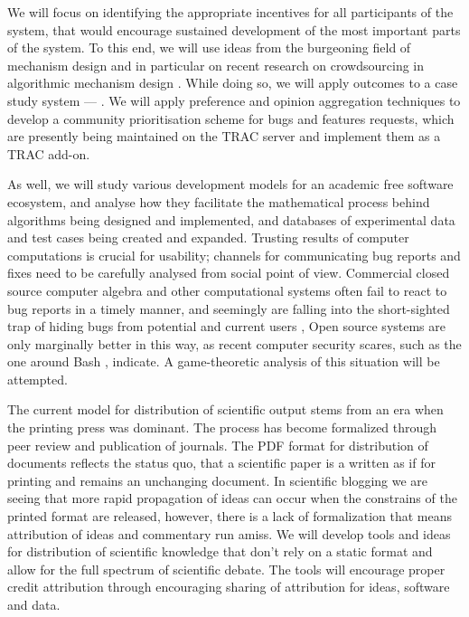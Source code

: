 \begin{workpackage}[id=social-aspects,wphases=1-48!.5,
  title=Social Aspects,
  lead=UO,
  UORM=1,USHRM=8, USORM=5]
\begin{wpdescription}
We will focus on identifying the appropriate incentives for all
participants of the system, that would encourage sustained development of the
most important parts of the system.  To this end, we will use ideas from the
burgeoning field of mechanism design \cite{AGTbook} and in
particular on recent research on crowdsourcing in algorithmic mechanism design
\cite{crowds}.  While doing so, we will apply outcomes to a case study
system --- \Sage.
We will apply preference and opinion aggregation techniques \cite{pref-aggr} to  develop
a community prioritisation scheme for \Sage bugs and features requests, which
are presently being maintained on the \Sage TRAC server \cite{trac-sagemath}  and implement
them as a TRAC \cite{Trac} add-on.

As well, we will study various development models for an academic free software ecosystem,
and analyse how they facilitate the mathematical process behind algorithms being
designed and implemented,  and databases of experimental data and test cases being
created and expanded.
Trusting results of computer
computations is crucial for usability; channels for communicating bug reports
and fixes need to be carefully analysed from social point of view.
Commercial closed source computer algebra and other computational systems often
fail to react to bug reports in a timely manner, and seemingly are falling into the
short-sighted trap of hiding bugs from potential and current users \cite{misfort},
Open source  systems are only marginally better in this way, as recent
computer security scares, such as the one around Bash \cite{shellshock}, indicate.
A game-theoretic analysis of this situation will be attempted.
\end{wpdescription}

\begin{tasklist}
\begin{task}[title=Modern Distribution of Scientific Output]
  The current model for distribution of scientific output stems from an era when the printing press was dominant. The process has become formalized through peer review and publication of journals. The PDF format for distribution of documents reflects the status quo, that a scientific paper is a written as if for printing and remains an unchanging document. In scientific blogging we are seeing that more rapid propagation of ideas can occur when the constrains of the printed format are released, however, there is a lack of formalization that means attribution of ideas and commentary run amiss. We will develop tools and ideas for distribution of scientific knowledge that don't rely on a static format and allow for the full spectrum of scientific debate. The tools will encourage proper credit attribution through encouraging sharing of attribution for ideas, software and data.
\end{task}


\end{tasklist}
\end{workpackage}

